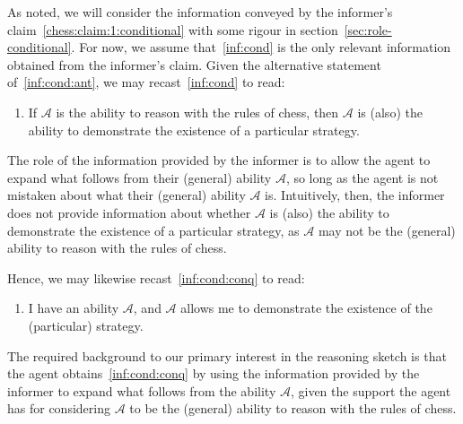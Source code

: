 \documentclass[10pt]{article}
\begin{document}
\begin{note}
  As noted, we will consider the information conveyed by the informer's claim~\ref{chess:claim:1:conditional} with some rigour in section~\ref{sec:role-conditional}.
  For now, we assume that~\ref{inf:cond} is the only relevant information obtained from the informer's claim.
  Given the alternative statement of~\ref{inf:cond:ant}, we may recast~\ref{inf:cond} to read:
  \begin{enumerate}[resume, label=(S\arabic*\('\)), ref=(S\arabic*\('\))]
  \item\label{inf:condp} If \(\mathcal{A}\) is the ability to reason with the rules of chess, then \(\mathcal{A}\) is (also) the ability to demonstrate the existence of a particular strategy.
  \end{enumerate}
  The role of the information provided by the informer is to allow the agent to expand what follows from their (general) ability \(\mathcal{A}\), so long as the agent is not mistaken about what their (general) ability \(\mathcal{A}\) is.
  Intuitively, then, the informer does not provide information about whether \(\mathcal{A}\) is (also) the ability to demonstrate the existence of a particular strategy, as \(\mathcal{A}\) may not be the (general) ability to reason with the rules of chess.

  Hence, we may likewise recast~\ref{inf:cond:conq} to read:
    \begin{enumerate}[resume, label=(S\arabic*\('\)), ref=(S\arabic*\('\))]
  \item\label{inf:cond:conqp} I have an ability \(\mathcal{A}\), and \(\mathcal{A}\) allows me to demonstrate the existence of the (particular) strategy.
  \end{enumerate}
  The required background to our primary interest in the reasoning sketch is that the agent obtains~\ref{inf:cond:conq} by using the information provided by the informer to expand what follows from the ability \(\mathcal{A}\), given the support the agent has for considering \(\mathcal{A}\) to be the (general) ability to reason with the rules of chess.
\end{note}
\end{document}
